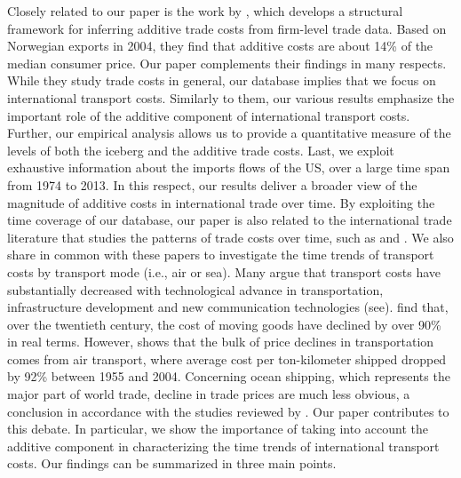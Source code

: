 \documentclass[a4paper,11pt]{article}
\begin{document}
Closely related to our paper is the work by \citet{Irrazabal_2015}, which develops a structural framework for inferring additive trade costs from firm-level trade data. Based on Norwegian exports in 2004, they find that additive costs are about 14\% of the median consumer price. Our paper complements their findings in many respects. While they study trade costs in general, our database implies that we focus on international transport costs. Similarly to them, our various results emphasize the important role of the additive component of international transport costs. Further, our empirical analysis allows us to provide a quantitative measure of the levels of both the iceberg and the additive trade costs. Last, we exploit exhaustive information about the imports flows of the US, over a large time span from 1974 to 2013. In this respect, our results deliver a broader view of the magnitude of additive costs in international trade over time. By exploiting the time coverage of our database, our paper is also related to the international trade literature that studies the patterns of trade costs over time, such as \cite{hummels2007} and \cite{Behar_Venables}. We also share in common with these papers to investigate the time trends of transport costs by transport mode (i.e., air or sea). Many argue that transport costs have substantially decreased with technological advance in transportation, infrastructure development and new communication technologies (see\citealp{Lafourcade_Thisse}). \cite{Glaeser04} find that, over the twentieth century, the cost of moving goods have declined by over 90\% in real terms. However, \cite{hummels2007} shows that the bulk of price declines in transportation comes from air transport, where average cost per ton-kilometer shipped dropped by 92\% between 1955 and 2004. Concerning ocean shipping, which represents the major part of world trade, decline in trade prices are much less obvious, a conclusion in accordance with the studies reviewed by \cite{Behar_Venables}. Our paper contributes to this debate. In particular, we show the importance of taking into account the additive component in characterizing the time trends of international transport costs. Our findings can be summarized in three main points.
\end{document}
